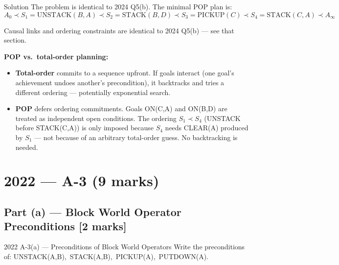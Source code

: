 \documentclass[12pt,a4paper]{article}
\begin{document}
\begin{solbox}{Solution}
The problem is identical to 2024 Q5(b). The minimal POP plan is:
\[
A_0 \prec S_1\!=\!\text{UNSTACK}(B,A) \prec S_2\!=\!\text{STACK}(B,D)
\prec S_3\!=\!\text{PICKUP}(C) \prec S_4\!=\!\text{STACK}(C,A) \prec A_\infty
\]

Causal links and ordering constraints are identical to 2024 Q5(b) --- see that section.

\textbf{POP vs.\ total-order planning:}
\begin{itemize}[noitemsep]
  \item \textbf{Total-order} commits to a sequence upfront. If goals interact
    (one goal's achievement undoes another's precondition), it backtracks
    and tries a different ordering --- potentially exponential search.
  \item \textbf{POP} defers ordering commitments. Goals ON(C,A) and ON(B,D)
    are treated as independent open conditions. The ordering
    $S_1 \prec S_4$ (UNSTACK before STACK(C,A)) is only imposed because
    $S_4$ needs CLEAR(A) produced by $S_1$ --- not because of an arbitrary
    total-order guess. No backtracking is needed.
\end{itemize}
\end{solbox}

\newpage

\section{2022 --- A-3 (9 marks)}

\subsection{Part (a) --- Block World Operator Preconditions [2 marks]}

\begin{qbox}{2022 A-3(a) --- Preconditions of Block World Operators}
Write the preconditions of:
UNSTACK(A,B),\ STACK(A,B),\ PICKUP(A),\ PUTDOWN(A).
\end{qbox}
\end{document}
